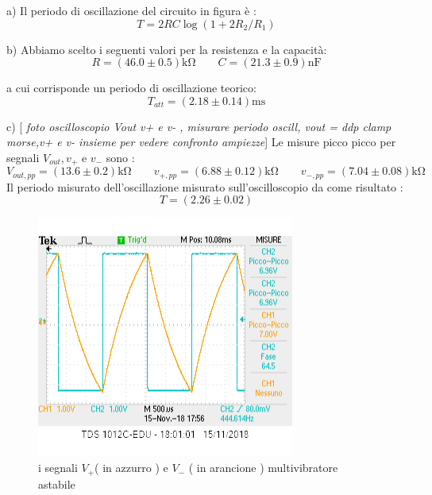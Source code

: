 \documentclass[10pt,a4paper]{article}
\newcommand{\rem}[1]{[\emph{#1}]}
\begin{document}
a)  Il periodo di oscillazione del circuito in figura è : \[ T = 2 RC \log( 1+ 2 R_2/R_1)\]





b) Abbiamo scelto i seguenti valori per la resistenza e la capacità:
\[ R = ( 46.0 \pm0.5 )\si{\kilo\ohm} \qquad   C = (21.3\pm0.9 )\si{\nano \farad}\]

a cui corrisponde un periodo di oscillazione teorico:
\[T_{att}= (2.18\pm 0.14 )\si{\milli \second}\]



c) \rem{ foto oscilloscopio Vout v+ e v- , misurare periodo oscill,  vout = ddp clamp morse,v+ e v- insieme per vedere confronto ampiezze}
Le misure picco picco per  segnali  $V_{out}, v_{+}$ e $v_{-}$ sono :
\[ V_{out,pp}= (13.6\pm 0.2)\si{\kilo\ohm} \qquad  v_{+,pp}= (6.88 \pm 0.12)\si{\kilo\ohm} \qquad   v_{-,pp}= ( 7.04 \pm0.08 ) \si{\kilo\ohm}\]
Il periodo misurato dell'oscillazione misurato sull'oscilloscopio da come risultato :
\[ T = (2.26 \pm 0.02)\]




\begin{figure}[h]
	\begin{center}
		
			\includegraphics[scale=0.8]{v+_v-.png}
		\caption{\small i segnali $V_+$( in azzurro ) e $ V_-$ ( in arancione )  multivibratore astabile}

		\label{fig:v+v-}
	\end{center}

\end{figure}
\end{document}

